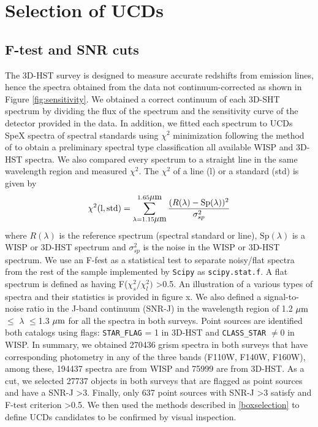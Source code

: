 \documentclass[manuscript]{aastex}
\begin{document}
\section{Selection of UCDs}\label{sec:selectionp}

\subsection{ F-test and SNR cuts}

The 3D-HST survey is designed to measure accurate redshifts from emission lines, hence the spectra obtained from the data not continuum-corrected as shown in Figure \ref{fig:sensitivity}. We obtained a correct continuum of each 3D-SHT spectrum by dividing the flux of the spectrum and the sensitivity curve of the detector provided in the data. In addition, we fitted each spectrum to UCDs SpeX spectra of spectral standards using $\chi^2$ minimization following the method of  \cite{2010ApJS..190..100K} to obtain a preliminary spectral type classification all available WISP and 3D-HST spectra. We also compared every spectrum to a straight line in the same wavelength region and measured $\chi^2$. The  $\chi^2 $ of a line (l) or a standard (std) is given by
\begin{equation}
\chi^2(\text{l}, \text{std}) = \sum _{\lambda = 1.15 \micron} ^{ 1.65 \micron} \frac{(R(\lambda)-\text{Sp} (\lambda))^2}{ \sigma_{sp} ^2 }
\end{equation} where $R(\lambda)$ is the reference spectrum (spectral standard or line), $\text{Sp}  (\lambda)$ is a WISP or 3D-HST spectrum and $\sigma_{sp} ^2 $ is the noise in the WISP or 3D-HST spectrum. We use an F-fest as a statistical test to separate noisy/flat spectra from the rest of the sample implemented by \texttt{Scipy} \citealt{scipy} as \texttt{scipy.stat.f}. A flat spectrum is defined as having F($\chi^2_s/ \chi ^2 _l)$ \textgreater  0.5. An illustration of a various types of spectra and their statistics is provided in figure x. We also defined a signal-to-noise ratio in the J-band continuum (SNR-J) in the wavelength region of 1.2 $\mbox{$\mu$m}$ $\leq$ $\lambda$ $\leq$1.3 $\mbox{$\mu$m}$ for all the spectra in both surveys. Point sources are identified both catalogs using flags: \texttt{STAR\_FLAG} = 1 in 3D-HST and \texttt{CLASS\_STAR} $\neq$0 in WISP. In summary, we obtained 270436 grism spectra in both surveys that have corresponding photometry in any of the three bands (F110W, F140W, F160W), among these, 194437 spectra are from WISP and 75999 are from 3D-HST. As a cut, we selected 27737 objects in both surveys that are flagged as point sources and have a SNR-J \textgreater3. Finally, only 637 point sources with SNR-J \textgreater3 satisfy and F-test criterion \textgreater0.5. We then used the methods described in \ref{boxselection} to define UCDs candidates to be confirmed by visual inspection. 
\end{document}

